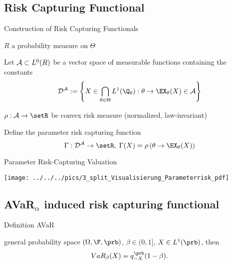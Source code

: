 


\subsection{Risk Capturing Functional}

{Construction of Risk Capturing Functionals}






	$R$ a probability measure on $\Theta$

	Let ${\cal A} \subset L^0(R)$ be a vector space of measurable functions containing the constants
\begin{equation}
{\cal D^A} := \left\{ X \in \bigcap_{\theta \in \Theta}  L^1(\Q_\theta): \theta \rightarrow \EX_\theta(X) \in {\cal A} \right\}
\end{equation}

	$\rho: {\cal A} \rightarrow \setR$ be convex risk measure (normalized, law-invariant)

Define the parameter risk capturing function
\begin{equation}
\Gamma: {\cal D^A} \rightarrow \setR, \; \Gamma(X) = \rho\left(\theta \rightarrow \EX_\theta(X)\right)
\end{equation}






{Parameter Risk-Capturing Valuation}
\begin{center}
\texttt{[image: ../../../pics/3\_split\_Visualisierung\_Parameterrisk\_pdf]}
\end{center}

\subsection{AVaR$_\alpha$ induced risk capturing functional}

{Definition AVaR}






	general probability space $(\Omega, \F, \prb)$, $\beta \in (0,1]$, $X\in L^1(\prb)$, then
$$
VaR_\beta(X) = q_{-X}^{\prb}(1-\beta).
$$

